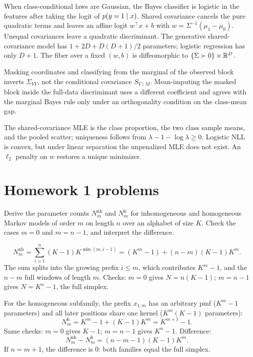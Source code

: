 When class-conditional laws are Gaussian, the Bayes classifier is logistic in the features after taking the logit of $p(y=1\mid x)$. Shared covariance cancels the pure quadratic terms and leaves an affine logit $w^\top x+b$ with $w=\Sigma^{-1}(\mu_1-\mu_0)$. Unequal covariances leave a quadratic discriminant. The generative shared-covariance model has $1+2D+D(D+1)/2$ parameters; logistic regression has only $D+1$. The fiber over a fixed $(w,b)$ is diffeomorphic to $\{\Sigma\succ 0\}\times\mathbb{R}^D$.

Masking coordinates and classifying from the marginal of the observed block inverts $\Sigma_{VV}$, not the conditional covariance $S_{V\mid M}$. Mean-imputing the masked block inside the full-data discriminant uses a different coefficient and agrees with the marginal Bayes rule only under an orthogonality condition on the class-mean gap.

The shared-covariance MLE is the class proportion, the two class sample means, and the pooled scatter; uniqueness follows from $\lambda-1-\log\lambda\ge 0$. Logistic NLL is convex, but under linear separation the unpenalized MLE does not exist. An $\ell_2$ penalty on $w$ restores a unique minimizer.

\section{Homework 1 problems}

\begin{hwqbox}
Derive the parameter counts $N_m^{\mathrm{nh}}$ and $N_m^{\mathrm{h}}$ for inhomogeneous and homogeneous Markov models of order $m$ on length $n$ over an alphabet of size $K$. Check the cases $m=0$ and $m=n-1$, and interpret the difference.
\end{hwqbox}
\begin{hwsolbox}
\[
N_m^{\mathrm{nh}}
=\sum_{i=1}^n(K-1)K^{\min(m,i-1)}
=(K^m-1)+(n-m)(K-1)K^m.
\]
The sum splits into the growing prefix $i\le m$, which contributes $K^m-1$, and the $n-m$ full windows of length $m$. Checks: $m=0$ gives $N=n(K-1)$; $m=n-1$ gives $N=K^n-1$, the full simplex.

For the homogeneous subfamily, the prefix $x_{1:m}$ has an arbitrary pmf ($K^m-1$ parameters) and all later positions share one kernel ($K^m(K-1)$ parameters):
\[
N_m^{\mathrm{h}}=K^m-1+(K-1)K^m=K^{m+1}-1.
\]
Same checks: $m=0$ gives $K-1$; $m=n-1$ gives $K^n-1$. Difference:
\[
N_m^{\mathrm{nh}}-N_m^{\mathrm{h}}=(n-m-1)(K-1)K^m.
\]
If $n=m+1$, the difference is $0$: both families equal the full simplex.
\end{hwsolbox}

